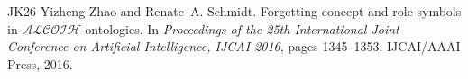 \documentclass[10pt,a4paper]{amsart}
\theoremstyle{plain}
\theoremstyle{definition}
\begin{document}
\begin{thebibliography}{{}JK{\etalchar{+}}26}
Yizheng Zhao and Renate~A. Schmidt.
\newblock Forgetting concept and role symbols in $\mathcal{ALCOIH}$-ontologies.
\newblock In {\em Proceedings of the 25th International Joint Conference on Artificial Intelligence, {IJCAI} 2016}, pages 1345--1353. {IJCAI/AAAI} Press, 2016.

\end{thebibliography}
\end{document}
